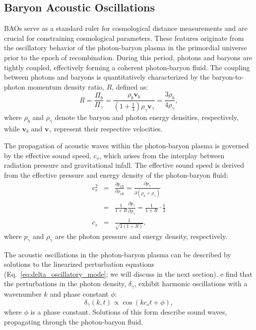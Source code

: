 \subsection{Baryon Acoustic Oscillations}
BAOs serve as a standard ruler for cosmological distance measurements and are crucial for constraining cosmological parameters. These features originate from the oscillatory behavior of the photon-baryon plasma in the primordial universe prior to the epoch of recombination. During this period, photons and baryons are tightly coupled, effectively forming a coherent photon-baryon fluid. The coupling between photons and baryons is quantitatively characterized by the baryon-to-photon momentum density ratio, \( R \), defined as:
\begin{equation}
    R = \frac{\Pi_b}{\Pi_\gamma} = \frac{\rho_b \mathbf{v}_b}{\left(1 + \frac{1}{3}\right) \rho_\gamma \mathbf{v}_\gamma} = \frac{3 \rho_b}{4 \rho_\gamma},
\end{equation}
where \( \rho_b \) and \( \rho_\gamma \) denote the baryon and photon energy densities, respectively, while \( \mathbf{v}_b \) and \( \mathbf{v}_\gamma \) represent their respective velocities. 

The propagation of acoustic waves within the photon-baryon plasma is governed by the effective sound speed, \( c_s \), which arises from the interplay between radiation pressure and gravitational infall. The effective sound speed is derived from the effective pressure and energy density of the photon-baryon fluid:
\begin{eqnarray}
    c_s^2 &=& \frac{\partial p_\mathrm{eff}}{\partial \rho_\mathrm{eff}} = \frac{\partial p_\gamma}{\partial (\rho_b + \rho_\gamma)} \nonumber \\
    &=& \frac{1}{1 + R} \frac{\partial p_\gamma}{\partial \rho_\gamma} = \frac{1}{1 + R} \cdot \frac{1}{3} \nonumber \\
    c_s &=& \frac{1}{\sqrt{3(1 + R)}},
\end{eqnarray}
where \( p_\gamma \) and \( \rho_\gamma \) are the photon pressure and energy density, respectively. 

The acoustic oscillations in the photon-baryon plasma can be described by solutions to the linearized perturbation equations (Eq.~\eqref{eq:delta_oscillatory_mode}; we will discuss in the next section). 
e find that the perturbations in the photon density, \( \delta_\gamma \), exhibit harmonic oscillations with a wavenumber \( k \) and phase constant \( \phi \):
\begin{equation}
\delta_\gamma(k, t) \propto \cos(k c_s t + \phi),
\label{eq:gamma_oscillations}
\end{equation}
where \( \phi \) is a phase constant. Solutions of this form describe sound waves, propagating through the photon-baryon fluid.

